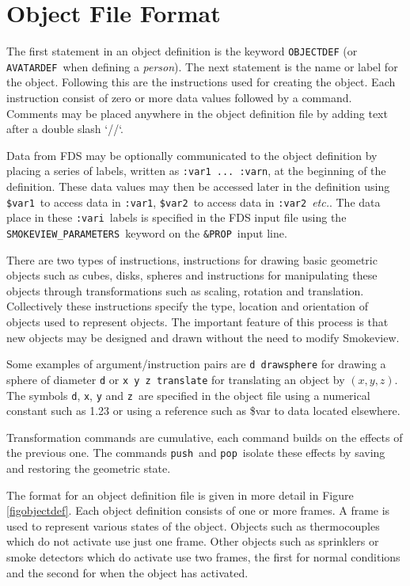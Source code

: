 \documentclass[11pt,twoside]{book}
\begin{document}
\section{Object File Format}
The first statement in an object definition is
the keyword {\tt OBJECTDEF} (or {\tt AVATARDEF}\ when defining a {\em person}).
The next statement is the name or label for the object.
Following this are the instructions used for creating the object.
Each instruction consist of zero or more data values followed by a command.
Comments may be placed anywhere in the object definition file by adding text
after a double slash `//`.

Data from FDS may be optionally communicated to the object definition
by placing a series of labels, written as {\tt :var1 ... :varn}, at the beginning of the definition.  These data values may then be accessed later in the definition using {\tt \$var1}\ to access data in {\tt :var1}, {\tt \$var2}\ to access data in {\tt :var2}\ {\em etc.}.
The data place in these {\tt :vari}\ labels is specified in the FDS input  file using the
{\tt SMOKEVIEW\_PARAMETERS}\ keyword on the {\tt \&PROP}\ input line.

There are two types of instructions, instructions for drawing
basic geometric objects such as cubes, disks, spheres
and instructions for manipulating these objects through transformations
such as scaling,
rotation and translation. Collectively these instructions specify
the type, location and orientation of objects used to represent
objects.  The important feature of this process is that new
objects may be designed and drawn without the need to modify
Smokeview.

Some examples of argument/instruction pairs are {\tt d drawsphere} for
drawing a sphere of diameter {\tt d} or {\tt x y z translate} for
translating an object by $(x,y,z)$.
The symbols {\tt d}, {\tt x}, {\tt y} and {\tt z}\ are
specified in the object file using a numerical constant such as 1.23 or using a reference such as \$var to data located elsewhere.

Transformation commands are
cumulative, each command builds on the effects of the previous
one.  The commands {\tt push}\ and {\tt pop}\
isolate these effects by saving and restoring the geometric state.

The format for an object definition file is given in more detail in Figure
\ref{figobjectdef}.  Each object definition consists of one or more
frames.  A frame is used to represent various states of the object.
Objects such as thermocouples which do not activate use
just one frame. Other objects such as sprinklers or smoke
detectors which do activate use two frames, the first for normal
conditions and the second for when the object has activated.
\end{document}
